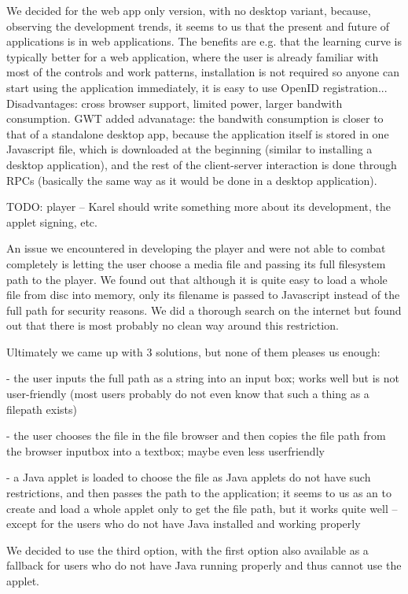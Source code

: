 We decided for the web app only version, with no desktop variant, because, observing the development trends, it seems to us that the present and future of applications is in web applications. The benefits are e.g. that the learning curve is typically better for a web application, where the user is already familiar with most of the controls and work patterns, installation is not required so anyone can start using the application immediately, it is easy to use OpenID registration... Disadvantages: cross browser support, limited power, larger bandwith consumption. GWT added advanatage: the bandwith consumption is closer to that of a standalone desktop app, because the application itself is stored in one Javascript file, which is downloaded at the beginning (similar to installing a desktop application), and the rest of the client-server interaction is done through RPCs (basically the same way as it would be done in a desktop application).

TODO: player -- Karel should write something more about its development, the applet signing, etc.

An issue we encountered in developing the player and were not able to combat completely is letting the user choose a media file and passing its full filesystem path to the player. We found out that although it is quite easy to load a whole file from disc into memory, only its filename is passed to Javascript instead of the full path for security reasons. We did a thorough search on the internet but found out that there is most probably no clean way around this restriction.

Ultimately we came up with 3 solutions, but none of them pleases us enough:

- the user inputs the full path as a string into an input box; works well but is not user-friendly (most users probably do not even know that such a thing as a filepath exists)

- the user chooses the file in the file browser and then copies the file path from the browser inputbox into a textbox; maybe even less userfriendly

- a Java applet is loaded to choose the file as Java applets do not have such restrictions, and then passes the path to the application; it seems to us as an  to create and load a whole applet only to get the file path, but it works quite well -- except for the users who do not have Java installed and working properly

We decided to use the third option, with the first option also available as a fallback for users who do not have Java running properly and thus cannot use the applet.


